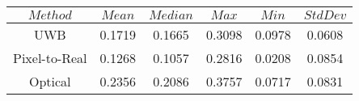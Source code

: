 \begin{table}[h]
\centering
\begin{tabular}{|c|c|c|c|c|c|}
\hline
$Method$ & $Mean$ & $Median$ & $Max$ & $Min$ & $StdDev$ \\
\hline
UWB & 0.1719 & 0.1665 & 0.3098 & 0.0978 & 0.0608 \\
\hline
Pixel-to-Real & 0.1268 & 0.1057 & 0.2816 & 0.0208 & 0.0854 \\
\hline
Optical & 0.2356 & 0.2086 & 0.3757 & 0.0717 & 0.0831 \\
\hline
\end{tabular}
\end{table}
